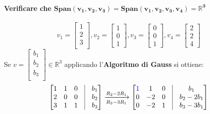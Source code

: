 \documentclass[a4paper, 12pt]{report}
\begin{document}
                \paragraph{Verificare che $\boldsymbol{Span(v_1,v_2,v_3)=Span(v_1,v_2,v_3,v_4)=\mathbb{R}^3}$}
                    $$
                    v_1=
                    \begin{bmatrix}
                        1\\
                        2\\
                        3\\
                    \end{bmatrix},
                    v_2=
                    \begin{bmatrix}
                        1\\
                        0\\
                        1
                    \end{bmatrix},
                    v_3=
                    \begin{bmatrix}
                        0\\
                        0\\
                        1
                    \end{bmatrix},
                    v_4=
                    \begin{bmatrix}
                        2\\
                        2\\
                        4
                    \end{bmatrix}
                    $$
                    Se 
                    $
                    v=
                    \begin{bmatrix}
                        b_1\\
                        b_2\\
                        b_3\\
                    \end{bmatrix}
                    \in \mathbb{R}^3
                    $
                    applicando l'\textbf{Algoritmo di Gauss} si ottiene:
                    $$
                    \begin{bmatrix}
                        1 & 1 & 0 & \vline & b_1\\
                        2 & 0 & 0 & \vline & b_2\\
                        3 & 1 & 1 & \vline & b_3
                    \end{bmatrix}
                    \xrightarrow[R_3-3R_1]{R_2-2R_1}
                    \begin{bmatrix}
                        \textcolor{blue}{1} & 1 & 0 & \vline & b_1\\
                        0 & -2 & 0 & \vline & b_2-2b_1\\
                        0 & -2 & 1 & \vline & b_3-3b_1
                    \end{bmatrix}
                    $$
\end{document}
